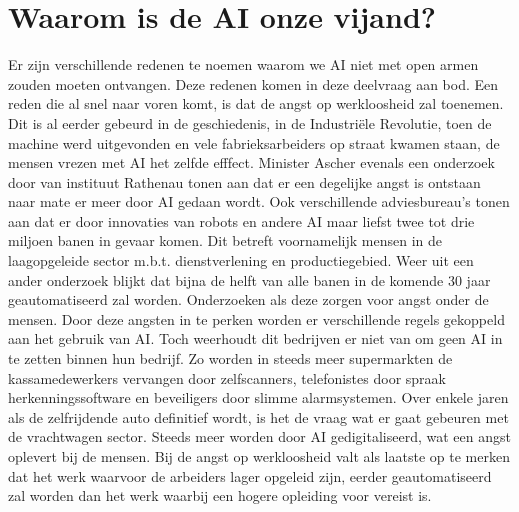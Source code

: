 \documentclass{article}
\begin{document}
\section{Waarom is de AI onze vijand?}
Er zijn verschillende redenen te noemen waarom we AI niet met open armen zouden moeten ontvangen. Deze redenen komen in deze deelvraag aan bod.
Een reden die al snel naar voren komt, is dat de angst op werkloosheid zal toenemen. Dit is al eerder gebeurd in de geschiedenis, in de Industriële Revolutie, toen de machine werd uitgevonden en vele fabrieksarbeiders op straat kwamen staan, de mensen vrezen met AI het zelfde efffect. Minister Ascher\cite{vriendofvijand} evenals een onderzoek door van instituut Rathenau\cite{vriendofvijand}  tonen aan dat er een degelijke angst is ontstaan naar mate er meer door AI gedaan wordt. Ook verschillende adviesbureau's tonen aan dat er door innovaties van robots en andere AI maar liefst twee tot drie miljoen banen in gevaar komen. Dit betreft voornamelijk mensen in de laagopgeleide sector m.b.t. dienstverlening en productiegebied. Weer uit een ander onderzoek\cite{vriendofvijand} blijkt dat bijna de helft van alle banen in de komende 30 jaar geautomatiseerd zal worden. Onderzoeken als deze zorgen voor angst onder de mensen. Door deze angsten in te perken worden er verschillende regels gekoppeld aan het gebruik van AI. Toch weerhoudt dit bedrijven er niet van om geen AI in te zetten binnen hun bedrijf. Zo worden in steeds meer supermarkten de kassamedewerkers vervangen door zelfscanners, telefonistes door spraak herkenningssoftware en beveiligers door slimme alarmsystemen. Over enkele jaren als de zelfrijdende auto definitief wordt, is het de vraag wat er gaat gebeuren met de vrachtwagen sector. Steeds meer worden door AI gedigitaliseerd, wat een angst oplevert bij de mensen. Bij de angst op werkloosheid valt als laatste op te merken dat het werk waarvoor de arbeiders lager opgeleid zijn, eerder geautomatiseerd zal worden dan het werk waarbij een hogere opleiding voor vereist is. 
\end{document}
